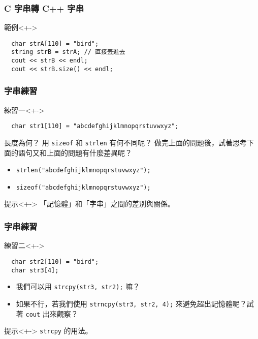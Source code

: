 \documentclass[utf8]{beamer}
\begin{document}
\begin{CJK}{UTF8}{bkai}
\begin{frame}[fragile]
  \frametitle{C 字串轉 C++ 字串}
  \begin{exampleblock}{範例}<+->
    \begin{lstlisting}
  char strA[110] = "bird";
  string strB = strA; // 直接丟進去
  cout << strB << endl;
  cout << strB.size() << endl;
    \end{lstlisting}
  \end{exampleblock}
\end{frame}

\begin{frame}[fragile]
  \frametitle{字串練習}
  \begin{block}{練習一}<+->
    \begin{lstlisting}
  char str1[110] = "abcdefghijklmnopqrstuvwxyz";
    \end{lstlisting}
  長度為何？\onslide<+-> 用 \lstinline{sizeof}{} 和 \lstinline{strlen}{} 有何不同呢？\onslide<+-> 做完上面的問題後，試著思考下面的語句又和上面的問題有什麼差異呢？
    \begin{itemize}[<+->]
    \item \lstinline{strlen("abcdefghijklmnopqrstuvwxyz");}{}
    \item \lstinline{sizeof("abcdefghijklmnopqrstuvwxyz");}{}
    \end{itemize}
  \end{block}
  \begin{exampleblock}{提示}<+->
  「記憶體」和「字串」之間的差別與關係。
  \end{exampleblock}
\end{frame}

\begin{frame}[fragile]
  \frametitle{字串練習}
  \begin{block}{練習二}<+->
    \begin{lstlisting}
  char str2[110] = "bird";  
  char str3[4];
    \end{lstlisting}
    \begin{itemize}[<+->]
    \item 我們可以用 \lstinline{strcpy(str3, str2);}{} 嘛？
    \item 如果不行，若我們使用 \lstinline{strncpy(str3, str2, 4);}{} 來避免超出記憶體呢？試著 \lstinline{cout}{} 出來觀察？
    \end{itemize}
  \end{block}
  \begin{exampleblock}{提示}<+->
  \lstinline{strcpy}{} 的用法。
  \end{exampleblock}
\end{frame}


\end{CJK}
\end{document}
